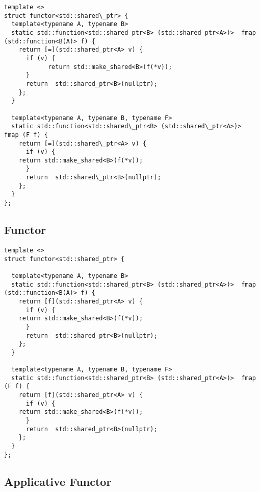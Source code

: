 \documentclass[12pt,fleqn]{article}
\begin{document}
%
%
%
\begin{minipage}{\linewidth}
\begin{lstlisting}[caption=shared pointer as container, label=shpfunctor]
template <>
struct functor<std::shared\_ptr> {
  template<typename A, typename B>
  static std::function<std::shared_ptr<B> (std::shared_ptr<A>)>  fmap (std::function<B(A)> f) {
    return [=](std::shared_ptr<A> v) {
      if (v) {
	        return std::make_shared<B>(f(*v)); 
      }
      return  std::shared_ptr<B>(nullptr);
    };
  }

  template<typename A, typename B, typename F>
  static std::function<std::shared\_ptr<B> (std::shared\_ptr<A>)>  fmap (F f) {
    return [=](std::shared\_ptr<A> v) {
      if (v) {
	return std::make_shared<B>(f(*v)); 
      }
      return  std::shared\_ptr<B>(nullptr);
    };
  }
};
\end{lstlisting}
\end{minipage}
%
%
%

   
%
\subsection{Functor}

\begin{minipage}{\linewidth}
\begin{lstlisting}[caption=functor implemention for std::shared\_ptr, label=ptrfunctor]
template <>
struct functor<std::shared_ptr> {

  template<typename A, typename B>
  static std::function<std::shared_ptr<B> (std::shared_ptr<A>)>  fmap (std::function<B(A)> f) {
    return [f](std::shared_ptr<A> v) {
      if (v) {
	return std::make_shared<B>(f(*v)); 
      }
      return  std::shared_ptr<B>(nullptr);
    };
  }

  template<typename A, typename B, typename F>
  static std::function<std::shared_ptr<B> (std::shared_ptr<A>)>  fmap (F f) {
    return [f](std::shared_ptr<A> v) {
      if (v) {
	return std::make_shared<B>(f(*v)); 
      }
      return  std::shared_ptr<B>(nullptr);
    };
  }
};
\end{lstlisting}
\end{minipage}
   
%
\subsection{Applicative Functor}
 
\end{document}
